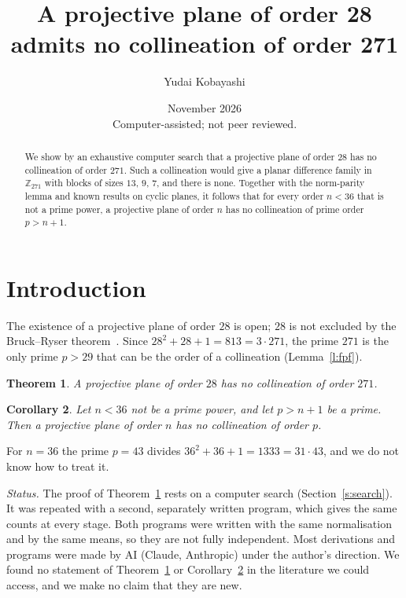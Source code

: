 \documentclass[11pt,a4paper]{article}
\title{A projective plane of order 28 admits no collineation of order 271}
\author{Yudai Kobayashi}
\date{November 2026\\[4pt]\small Computer-assisted; not peer reviewed.}
\newtheorem{theorem}{Theorem}
\newtheorem{corollary}[theorem]{Corollary}
\theoremstyle{remark}
\newcommand{\Zp}{\mathbb{Z}_{271}}
\begin{document}
\maketitle

\begin{abstract}
We show by an exhaustive computer search that a projective plane of order $28$ has no collineation of order $271$. Such a collineation would give a planar difference family in $\Zp$ with blocks of sizes $13$, $9$, $7$, and there is none. Together with the norm-parity lemma and known results on cyclic planes, it follows that for every order $n<36$ that is not a prime power, a projective plane of order $n$ has no collineation of prime order $p>n+1$.
\end{abstract}

\section{Introduction}

The existence of a projective plane of order $28$ is open; $28$ is not excluded by the Bruck--Ryser theorem~\cite{BR}. Since $28^2+28+1=813=3\cdot271$, the prime $271$ is the only prime $p>29$ that can be the order of a collineation (Lemma~\ref{l:fpf}).

\begin{theorem}\label{t:main}
A projective plane of order $28$ has no collineation of order $271$.
\end{theorem}

\begin{corollary}\label{c:small}
Let $n<36$ not be a prime power, and let $p>n+1$ be a prime. Then a projective plane of order $n$ has no collineation of order $p$.
\end{corollary}

For $n=36$ the prime $p=43$ divides $36^2+36+1=1333=31\cdot43$, and we do not know how to treat it.

\emph{Status.} The proof of Theorem~\ref{t:main} rests on a computer search (Section~\ref{s:search}). It was repeated with a second, separately written program, which gives the same counts at every stage. Both programs were written with the same normalisation and by the same means, so they are not fully independent. Most derivations and programs were made by AI (Claude, Anthropic) under the author's direction. We found no statement of Theorem~\ref{t:main} or Corollary~\ref{c:small} in the literature we could access, and we make no claim that they are new.
\end{document}
